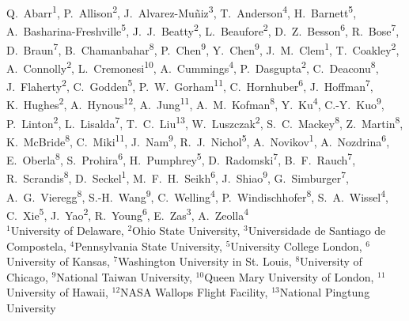 
\noindent
Q.~Abarr\textsuperscript{1}, 
P.~Allison\textsuperscript{2}, 
J.~Alvarez-Mu\~niz\textsuperscript{3}, 
T.~Anderson\textsuperscript{4}, 
H.~Barnett\textsuperscript{5}, 
A.~Basharina-Freshville\textsuperscript{5}, 
J.~J.~Beatty\textsuperscript{2}, 
L.~Beaufore\textsuperscript{2}, 
D.~Z.~Besson\textsuperscript{6}, 
R.~Bose\textsuperscript{7}, 
D.~Braun\textsuperscript{7}, 
B.~Chamanbahar\textsuperscript{8}, 
P.~Chen\textsuperscript{9}, 
Y.~Chen\textsuperscript{9}, 
J.~M.~Clem\textsuperscript{1}, 
T.~Coakley\textsuperscript{2}, 
A.~Connolly\textsuperscript{2}, 
L.~Cremonesi\textsuperscript{10}, 
A.~Cummings\textsuperscript{4}, 
P.~Dasgupta\textsuperscript{2}, 
C.~Deaconu\textsuperscript{8}, 
J.~Flaherty\textsuperscript{2}, 
C.~Godden\textsuperscript{5}, 
P.~W.~Gorham\textsuperscript{11}, 
C.~Hornhuber\textsuperscript{6}, 
J.~Hoffman\textsuperscript{7}, 
K.~Hughes\textsuperscript{2}, 
A.~Hynous\textsuperscript{12}, 
A.~Jung\textsuperscript{11}, 
A.~M.~Kofman\textsuperscript{8}, 
Y.~Ku\textsuperscript{4}, 
C.-Y.~Kuo\textsuperscript{9}, 
P.~Linton\textsuperscript{2}, 
L.~Lisalda\textsuperscript{7}, 
T.~C.~Liu\textsuperscript{13}, 
W.~Luszczak\textsuperscript{2}, 
S.~C.~Mackey\textsuperscript{8}, 
Z.~Martin\textsuperscript{8}, 
K.~McBride\textsuperscript{8}, 
C.~Miki\textsuperscript{11}, 
J.~Nam\textsuperscript{9}, 
R.~J.~Nichol\textsuperscript{5}, 
A.~Novikov\textsuperscript{1}, 
A.~Nozdrina\textsuperscript{6}, 
E.~Oberla\textsuperscript{8}, 
S.~Prohira\textsuperscript{6}, 
H.~Pumphrey\textsuperscript{5}, 
D.~Radomski\textsuperscript{7}, 
B.~F.~Rauch\textsuperscript{7}, 
R.~Scrandis\textsuperscript{8}, 
D.~Seckel\textsuperscript{1}, 
M.~F.~H.~Seikh\textsuperscript{6}, 
J.~Shiao\textsuperscript{9}, 
G.~Simburger\textsuperscript{7}, 
A.~G.~Vieregg\textsuperscript{8}, 
S.-H.~Wang\textsuperscript{9}, 
C.~Welling\textsuperscript{4}, 
P.~Windischhofer\textsuperscript{8}, 
S.~A.~Wissel\textsuperscript{4}, 
C.~Xie\textsuperscript{5}, 
J.~Yao\textsuperscript{2}, 
R.~Young\textsuperscript{6}, 
E.~Zas\textsuperscript{3}, 
A.~Zeolla\textsuperscript{4}
\vspace{1em}
\scriptsize\\
\noindent
$^{1}$University of Delaware,
$^{2}$Ohio State University,
$^{3}$Universidade de Santiago de Compostela,
$^{4}$Pennsylvania State University,
$^{5}$University College London,
$^{6}$University of Kansas,
$^{7}$Washington University in St. Louis,
$^{8}$University of Chicago,
$^{9}$National Taiwan University,
$^{10}$Queen Mary University of London,
$^{11}$University of Hawaii,
$^{12}$NASA Wallops Flight Facility,
$^{13}$National Pingtung University